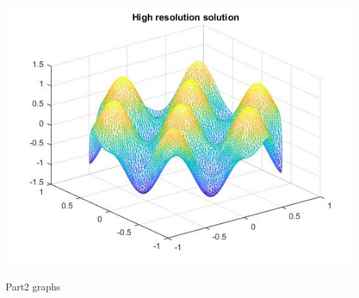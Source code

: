 \documentclass[12pt]{article}
\begin{document}
	\includegraphics[width=\textwidth]{p2_1_highres}
	
	
	\newpage
	\large Part2 graphs
	
\end{document}
